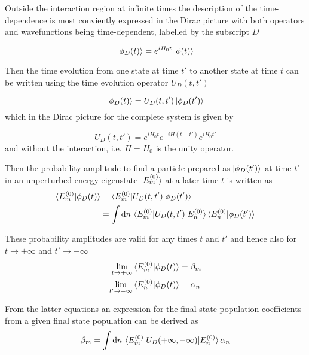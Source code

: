 Outside the interaction region at infinite times the description of the
time-dependence is most conviently expressed in the Dirac picture with both
operators and wavefunctions being time-dependent, labelled by the subscript $D$

\begin{equation}
 \ket{\phi_D(t)} = e^{iH_0t} \ket{\phi(t)}
\end{equation}

Then the time evolution from one state at time $t'$ to another state at time
$t$ can be written using the time evolution operator $U_D(t,t')$

\begin{equation}
 \ket{\phi_D(t)} = U_D(t,t')  \ket{\phi_D(t')}
\end{equation}
which in the Dirac picture for the complete system is given by

\begin{equation}
 U_D(t,t') = e^{iH_0t} e^{-iH(t-t')} e^{iH_0t'}
\end{equation}
and without the interaction, i.e. $H=H_0$ is the unity operator.

Then the probability amplitude to find a particle prepared as $\ket{\phi_D(t')}$
at time $t'$ in an unperturbed energy eigenstate $\ket{E_m^{(0)}}$ at a later
time $t$ is written as
\begin{align}
 \braket{E_m^{(0)} | \phi_D(t)} &= \braket{E_m^{(0)}| U_D(t,t') | \phi_D(t')}\\
  &= \int \mathrm{d} n \, \braket{E_m^{(0)}| U_D(t,t') |E_n^{(0)}}
     \braket{E_n^{(0)}|\phi_D(t')}
\end{align}

These probability amplitudes are valid for any times $t$ and $t'$ and hence also
for $t\rightarrow +\infty$ and $t' \rightarrow -\infty$
\begin{align}
 \lim_{t \to +\infty} \braket{E_m^{(0)} | \phi_D(t)} &= \mathbf{\beta}_m   \\
 \lim_{t' \to -\infty} \braket{E_n^{(0)} | \phi_D(t)} &= \mathbf{\alpha}_n
\end{align}

From the latter equations an expression for the final state population coefficients
from a given final state population can be derived as
\begin{align}
 \mathbf{\beta}_m = \int \mathrm{d} n \,
     \braket{E_m^{(0)}| U_D(+\infty,-\infty) |E_n^{(0)}} \mathbf{\alpha}_n
\end{align}

